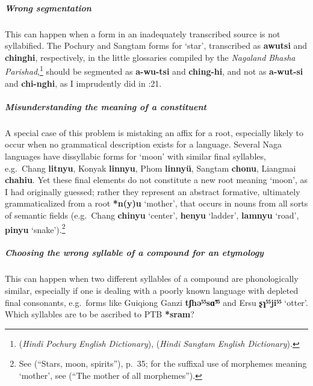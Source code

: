 \subparagraph{Wrong segmentation}
This can happen when a form in an inadequately transcribed source is not
syllabified. The Pochury and Sangtam forms for ‘star’, transcribed as \textbf{awutsi}
and \textbf{chinghi}, respectively, in the little glossaries compiled by the
\textit{Nagaland
Bhasha Parishad},\footnote{\citealt{BBK-Pochury} (\textit{Hindi Pochury English Dictionary}),
\citeyear{BBK-Sangtam} (\textit{Hindi
Sangtam English Dictionary}).}
 should be segmented as \textbf{a-wu-tsi} and \textbf{ching-hi},
and not as \textbf{a-wut-si} and \textbf{chi-nghi}, as I
imprudently did in \citealt{JAM-SMS}:21.


\subparagraph{Misunderstanding the meaning of a constituent}
A special case of this problem is mistaking an affix for a root, especially
likely to occur when no grammatical description exists for a language. Several
Naga languages have dissyllabic forms for ‘moon’ with similar final syllables,
e.g.\ Chang \textbf{litnyu}, Konyak \textbf{linnyu},
Phom \textbf{linnyü}, Sangtam \textbf{chonu}, Liangmai \textbf{chahiu}.
Yet these final elements do not constitute a new root meaning ‘moon’, as I had
originally guessed; rather they represent an abstract formative, ultimately
grammaticalized from a root \textbf{*n(y)u} ‘mother’, that occurs in nouns from all sorts
of semantic fields (e.g.\ Chang \textbf{chinyu} ‘center’,
\textbf{henyu} ‘ladder’, \textbf{lamnyu} ‘road’,
\textbf{pinyu} ‘snake’).\footnote{See \citealt{JAM-SMS} (“Stars, moon, spirits”), p.\ 35;
for the suffixal use of morphemes meaning ‘mother’, see \citealt{JAM-MOAM} (“The mother of all
morphemes”).}


\subparagraph{Choosing the wrong syllable of a compound for an etymology}
This can happen when two different syllables of a compound are phonologically
similar, especially if one is dealing with a poorly known language with depleted
final consonants, e.g.\ forms like Guiqiong Ganzi \textbf{tʃhə⁵⁵sɑ̃⁵⁵}
and Ersu \textbf{ʂɿ⁵⁵ji⁵⁵} ‘otter’.
Which syllables are to be ascribed to PTB \textbf{*sram}? 


